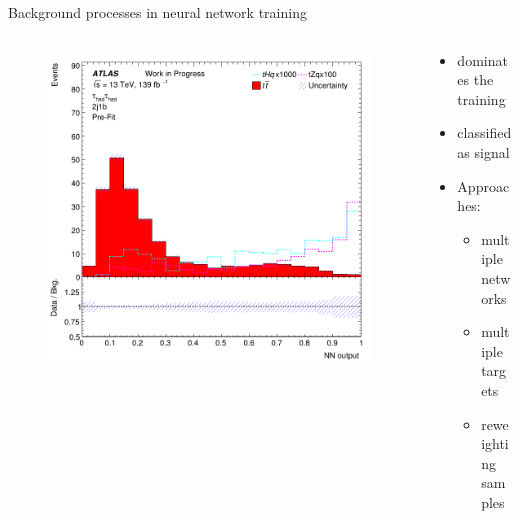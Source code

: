\begin{frame}{Background processes in neural network training}
    \begin{columns}
        \begin{column}{0.5\textwidth}
            \begin{figure}
                \centering
                \includegraphics[width=\textwidth]{sgBkgComp}
            \end{figure}
        \end{column}
        \begin{column}{0.5\textwidth}
            \begin{itemize}
                \item \ttbar dominates the training
                \vspace{0.5cm}
                \item \tZq classified as signal
                \vspace{0.5cm}
                \item Approaches:
                    \begin{itemize}
                        \item multiple networks
                        \item multiple targets
                        \item reweighting samples
                    \end{itemize} 
            \end{itemize}
        \end{column}
    \end{columns}
\end{frame}
